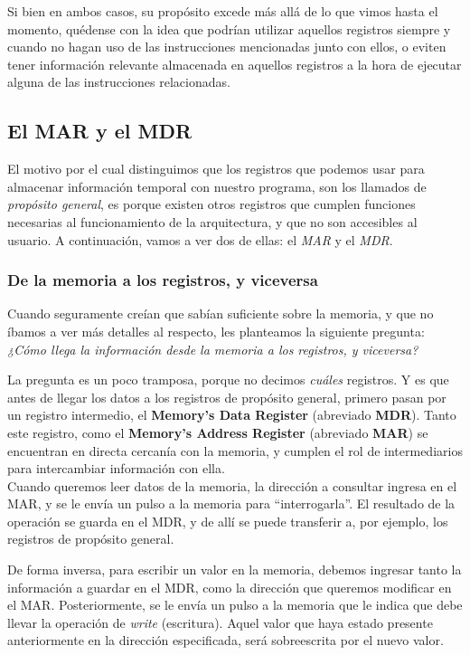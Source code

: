 \documentclass[a4paper, titlepage]{report}
\begin{document}
	Si bien en ambos casos, su propósito excede más allá de lo que vimos hasta el momento, quédense con la idea que podrían utilizar aquellos registros siempre y cuando no hagan uso de las instrucciones mencionadas junto con ellos, o eviten tener información relevante almacenada en aquellos registros a la hora de ejecutar alguna de las instrucciones relacionadas.
	
	\subsection{El MAR y el MDR} %
	\label{sec:mar-mdr}
	
	El motivo por el cual distinguimos que los registros que podemos usar para almacenar información temporal con nuestro programa, son los llamados de \textit{propósito general}, es porque existen otros registros que cumplen funciones necesarias al funcionamiento de la arquitectura, y que no son accesibles al usuario. A continuación, vamos a ver dos de ellas: el \textit{MAR} y el \textit{MDR}.
	
	\subsubsection{De la memoria a los registros, y viceversa}
	
	Cuando seguramente creían que sabían suficiente sobre la memoria, y que no íbamos a ver más detalles al respecto, les planteamos la siguiente pregunta: \textit{¿Cómo llega la información desde la memoria a los registros, y viceversa?}
	
	La pregunta es un poco tramposa, porque no decimos \textit{cuáles} registros. Y es que antes de llegar los datos a los registros de propósito general, primero pasan por un registro intermedio, el \textbf{Memory's Data Register} (abreviado \textbf{MDR}). Tanto este registro, como el \textbf{Memory's Address Register} (abreviado \textbf{MAR}) se encuentran en directa cercanía con la memoria, y cumplen el rol de intermediarios para intercambiar información con ella.\\
	
	Cuando queremos leer datos de la memoria, la dirección a consultar ingresa en el MAR, y se le envía un pulso a la memoria para ``interrogarla''. El resultado de la operación se guarda en el MDR, y de allí se puede transferir a, por ejemplo, los registros de propósito general.
	
	De forma inversa, para escribir un valor en la memoria, debemos ingresar tanto la información a guardar en el MDR, como la dirección que queremos modificar en el MAR. Posteriormente, se le envía un pulso a la memoria que le indica que debe llevar la operación de \textit{write} (escritura). Aquel valor que haya estado presente anteriormente en la dirección especificada, será sobreescrita por el nuevo valor.\\
	
\end{document}
